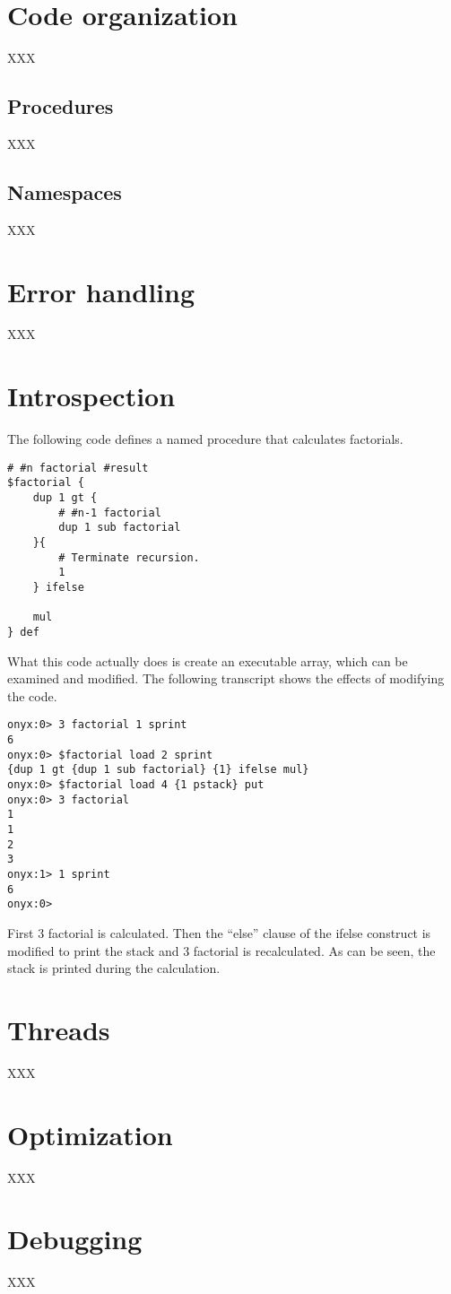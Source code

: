 \section{Code organization}
XXX
\subsection{Procedures}
XXX
\subsection{Namespaces}
XXX

\section{Error handling}
XXX

\section{Introspection}
\label{onyxtut:introspection}

The following code defines a named procedure that calculates factorials.

\begin{verbatim}
# #n factorial #result
$factorial {
    dup 1 gt {
        # #n-1 factorial
        dup 1 sub factorial
    }{
        # Terminate recursion.
        1
    } ifelse

    mul
} def
\end{verbatim}

What this code actually does is create an executable array, which can be
examined and modified.  The following transcript shows the effects of modifying
the code.

\begin{verbatim}
onyx:0> 3 factorial 1 sprint
6
onyx:0> $factorial load 2 sprint
{dup 1 gt {dup 1 sub factorial} {1} ifelse mul}
onyx:0> $factorial load 4 {1 pstack} put
onyx:0> 3 factorial 
1
1
2
3
onyx:1> 1 sprint
6
onyx:0>
\end{verbatim}

First 3 factorial is calculated.  Then the ``else'' clause of the ifelse
construct is modified to print the stack and 3 factorial is recalculated.  As
can be seen, the stack is printed during the calculation.

\section{Threads}
XXX

\section{Optimization}
XXX

\section{Debugging}
XXX
